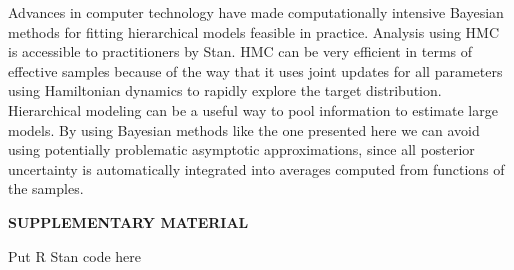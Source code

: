\documentclass[12pt]{article}
\begin{document}
Advances in computer technology have made computationally intensive Bayesian methods for fitting hierarchical models feasible in practice. Analysis using HMC is accessible to practitioners by Stan. HMC can be very efficient in terms of effective samples because of the way that it uses joint updates for all parameters using Hamiltonian dynamics to rapidly explore the target distribution. Hierarchical modeling can be a useful way to pool information to estimate large models. By using Bayesian methods like the one presented here we can avoid using potentially problematic asymptotic approximations, since all posterior uncertainty is automatically integrated into averages computed from functions of the samples.



    


\bigskip
\begin{center}
{\large\bf SUPPLEMENTARY MATERIAL}
\end{center}

\begin{description}

\item Put R Stan code here

\end{description}



\end{document}
